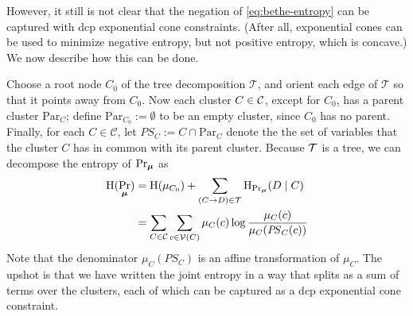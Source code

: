 \documentclass[twoside]{article}
\begin{document}
However,
it still is not clear that the negation of \eqref{eq:bethe-entropy} can be
captured with dcp exponential cone constraints.
(After all, exponential cones can be used to minimize negative entropy, but not positive entropy, which is concave.)
We now describe how this can be done.

\def\Par{\mathrm{Par}}
\def\Pash{\mathit{P\!S}}

Choose a root node $C_0$ of the tree decomposition $\mathcal T$, and orient each edge of $\mathcal T$ so that it points away from $C_0$.
Now each cluster $C \in \cal C$, except for $C_0$, has a parent cluster $\Par_C$;
define $\Par_{C_0} := \emptyset$ to be an empty cluster, since $C_0$ has no parent.
Finally, for each $C \in \mathcal C$, let $\Pash_C := C \cap \Par_C$ denote the
the set of variables that the cluster $C$ has in common with its parent cluster.
Because $\cal T$ is a tree, we can decompose the entropy of $\Pr_{\boldsymbol\mu}$ as
%
\begin{align*}
    \H(\Pr_{\bmu}) &=
        \H(\mu_{C_0}) +
        \sum_{(C \to D) \in \mathcal T}
        \H_{\Pr_{\bmu}}(D \mid C)\\
    &= \sum_{C \in \cal C}
        \sum_{c \in \V(C)} \mu_C(c) \log \frac
            {\mu_C(c)}{\mu_C( \Pash_C(c) )}
\end{align*}
%
Note that the denominator $\mu_C(\Pash_C)$ is an affine transformation of $\mu_C$.
The upshot is that we have written the joint entropy in a way that
splits as a sum of terms over the clusters, each of which can be captured as a dcp exponential cone constraint.
\end{document}
